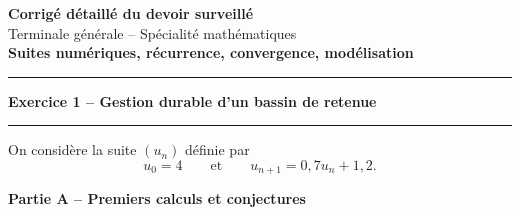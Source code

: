 \documentclass[11pt,a4paper]{article}
\begin{document}
\begin{center}
    {\LARGE \textbf{Corrigé détaillé du devoir surveillé}}\\[0.2cm]
    {\large Terminale générale -- Spécialité mathématiques}\\[0.2cm]
    \textbf{Suites numériques, récurrence, convergence, modélisation}
\end{center}

\vspace{0.2cm}

\begin{center}
\end{center}

\vspace{0.3cm}

\hrule
\vspace{0.4cm}
\begin{center}
    \textbf{\large Exercice 1 -- Gestion durable d’un bassin de retenue}
\end{center}
\vspace{0.2cm}
\hrule
\vspace{0.3cm}

On considère la suite $(u_n)$ définie par
\[
u_0=4
\qquad \text{et} \qquad
u_{n+1}=0{,}7u_n+1{,}2.
\]

\medskip

\textbf{Partie A -- Premiers calculs et conjectures}
\end{document}
